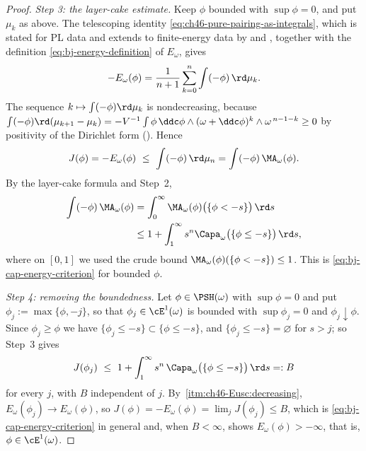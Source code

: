 \begin{proof}
\emph{Step 3: the layer-cake estimate.}  Keep $\phi$ bounded with
$\sup\phi=0$, and put $\mu_k$ as above.  The telescoping identity
\eqref{eq:ch46-pure-pairing-as-integrals}, which is stated for PL data and
extends to finite-energy data by  and
, together with the definition
\eqref{eq:bj-energy-definition} of $E_\omega$, gives
\[
 -E_\omega(\phi)=\frac1{n+1}\sum_{k=0}^n\int(-\phi)\,\rd\mu_k .
\]
The sequence $k\mapsto\int(-\phi)\rd\mu_k$ is nondecreasing, because
$\int(-\phi)\rd(\mu_{k+1}-\mu_k)
=-V^{-1}\int\phi\,\ddc\phi\wedge(\omega+\ddc\phi)^k\wedge\omega^{\,n-1-k}
\ge0$ by positivity of the Dirichlet form
().  Hence
\[
 J(\phi)=-E_\omega(\phi)\ \le\ \int(-\phi)\,\rd\mu_n
 =\int(-\phi)\,\MA_\omega(\phi).
\]
By the layer-cake formula and Step~2,
\[
 \begin{aligned}
  \int(-\phi)\,\MA_\omega(\phi)
   &=\int_0^\infty
     \MA_\omega(\phi)\bigl(\{\phi<-s\}\bigr)\,\rd s\\
   &\le1+\int_1^\infty s^n
     \Capa_\omega\bigl(\{\phi\le-s\}\bigr)\,\rd s,
 \end{aligned}
\]
where on $[0,1]$ we used the crude bound
$\MA_\omega(\phi)(\{\phi<-s\})\le1$.  This is
\eqref{eq:bj-cap-energy-criterion} for bounded $\phi$.

\emph{Step 4: removing the boundedness.}  Let $\phi\in\PSH(\omega)$ with
$\sup\phi=0$ and put $\phi_j:=\max\{\phi,-j\}$, so that
$\phi_j\in\cE^1(\omega)$ is bounded with $\sup\phi_j=0$ and
$\phi_j\downarrow\phi$.  Since $\phi_j\ge\phi$ we have
$\{\phi_j\le-s\}\subset\{\phi\le-s\}$, and $\{\phi_j\le-s\}=\varnothing$
for $s>j$; so Step~3 gives
\[
 J(\phi_j)\ \le\ 1+\int_1^\infty s^n\,
   \Capa_\omega\bigl(\{\phi\le-s\}\bigr)\,\rd s=:B
\]
for every $j$, with $B$ independent of $j$.  By
\,\cref{itm:ch46-Eusc:decreasing},
$E_\omega(\phi_j)\to E_\omega(\phi)$, so
$J(\phi)=-E_\omega(\phi)=\lim_jJ(\phi_j)\le B$, which is
\eqref{eq:bj-cap-energy-criterion} in general and, when $B<\infty$, shows
$E_\omega(\phi)>-\infty$, that is, $\phi\in\cE^1(\omega)$.
\end{proof}

